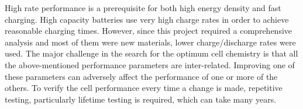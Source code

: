High rate performance is a prerequisite for both high energy density and fast charging. High capacity batteries use very high charge rates in order to achieve reasonable charging times. However, since this project required a comprehensive analysis and most of them were new materials, lower charge/discharge rates were used. 
The major challenge in the search for the optimum cell chemistry is that all the above-mentioned performance parameters are inter-related. Improving one of these parameters can adversely affect the performance of one or more of the others. To verify the cell performance every time a change is made, repetitive testing, particularly lifetime testing is required, which can take many years.





















